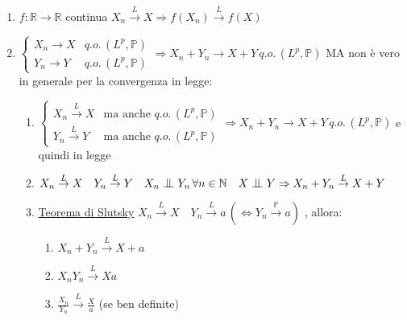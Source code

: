 \documentclass[openany]{book} %
\newcommand{\ind}{\mathrel{\text{\scalebox{1.07}{$\perp\mkern-10mu\perp$}}}}
\begin{document}
\begin{enumerate}

	\item $f:\mathbb{R}\rightarrow \mathbb{R}$ continua $X_n \overset{L}{\rightarrow}X \Rightarrow f(X_n) \overset{L}{\rightarrow}f(X)$

	\item $\left\{\begin{array}{ll}X_n \rightarrow X & q.o.\,(L^p,\mathbb{P})\\ Y_n \rightarrow Y & q.o.\,(L^p,\mathbb{P})\end{array} \right. \Rightarrow X_n+Y_n \rightarrow X+Y\,q.o.\,(L^p,\mathbb{P})$ MA non è vero in generale per la convergenza in legge:

	      \begin{enumerate}

		      \item $\left\{\begin{array}{ll}X_n \overset{L}\rightarrow X & \text{ma anche }q.o.\,(L^p,\mathbb{P})\\ Y_n\overset{L}\rightarrow Y & \text{ma anche }q.o.\,(L^p,\mathbb{P})\end{array} \right. \Rightarrow X_n+Y_n \rightarrow X+Y\,q.o.\,(L^p,\mathbb{P})$ e quindi in legge

		      \item $X_n \overset{L}\rightarrow X\quad Y_n \overset{L}\rightarrow Y\quad X_n\ind Y_n\,\forall n\in \mathbb{N}\quad X\ind Y \Rightarrow X_n+Y_n\overset{L}{\rightarrow}X+Y$

		      \item \underline{Teorema di Slutsky} $X_n \overset{L}\rightarrow X\quad Y_n \overset{L}\rightarrow a\, (\Leftrightarrow Y_n \overset{\mathbb{P}}{\rightarrow}a)$ , allora:

		            \begin{enumerate}

			            \item $X_n+Y_n \overset{L}{\rightarrow}X+a$

			            \item $X_nY_n \overset{L}{\rightarrow}Xa$

			            \item $\frac{X_n}{Y_n} \overset{L}{\rightarrow}\frac{X}{a}$ (se ben definite)

		            \end{enumerate}

	      \end{enumerate}

\end{enumerate}
\end{document}
